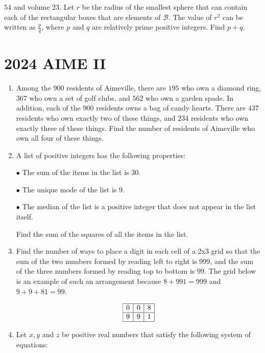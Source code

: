 \documentclass{article}
\begin{document}
\begin{enumerate}[label=\arabic*., itemsep=0.5em]
$54$ and volume $23$. Let $r$ be the radius of the smallest sphere that can contain each of the rectangular boxes that are elements of $\mathcal{B}$. The value of $r^2$ can be written as $\frac{p}{q}$, where $p$ and $q$ are relatively prime positive integers. Find $p+q$.\par \vspace{0.5em}\end{enumerate}\newpage\section*{2024 AIME II}\begin{enumerate}[label=\arabic*., itemsep=0.5em]\item Among the $900$ residents of Aimeville, there are $195$ who own a diamond ring, $367$ who own a set of golf clubs, and $562$ who own a garden spade. In addition, each of the $900$ residents owns a bag of candy hearts. There are $437$ residents who own exactly two of these things, and $234$ residents who own exactly three of these things. Find the number of residents of Aimeville who own all four of these things.\par \vspace{0.5em}\item A list of positive integers has the following properties:

$\bullet$ The sum of the items in the list is $30$.

$\bullet$ The unique mode of the list is $9$.

$\bullet$ The median of the list is a positive integer that does not appear in the list itself.

Find the sum of the squares of all the items in the list.\par \vspace{0.5em}\item Find the number of ways to place a digit in each cell of a 2x3 grid so that the sum of the two numbers formed by reading left to right is $999$, and the sum of the three numbers formed by reading top to bottom is $99$. The grid below is an example of such an arrangement because $8+991=999$ and $9+9+81=99$.


\begin{equation*}
\begin{array}{|c|c|c|} \hline
0 & 0 & 8 \\ \hline
9 & 9 & 1 \\ \hline
\end{array}
\end{equation*}
\par \vspace{0.5em}\item Let $x,y$ and $z$ be positive real numbers that satisfy the following system of equations:


\end{enumerate}
\end{document}
